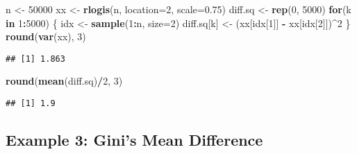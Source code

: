 \documentclass[]{book}
\newenvironment{Shaded}{\begin{snugshade}}{\end{snugshade}}
\newcommand{\ControlFlowTok}[1]{\textcolor[rgb]{0.13,0.29,0.53}{\textbf{#1}}}
\newcommand{\DataTypeTok}[1]{\textcolor[rgb]{0.13,0.29,0.53}{#1}}
\newcommand{\DecValTok}[1]{\textcolor[rgb]{0.00,0.00,0.81}{#1}}
\newcommand{\FloatTok}[1]{\textcolor[rgb]{0.00,0.00,0.81}{#1}}
\newcommand{\KeywordTok}[1]{\textcolor[rgb]{0.13,0.29,0.53}{\textbf{#1}}}
\newcommand{\NormalTok}[1]{#1}
\newcommand{\OperatorTok}[1]{\textcolor[rgb]{0.81,0.36,0.00}{\textbf{#1}}}
\newcommand{\StringTok}[1]{\textcolor[rgb]{0.31,0.60,0.02}{#1}}
\begin{document}
\begin{Shaded}
\begin{Highlighting}[]
\NormalTok{n <-}\StringTok{ }\DecValTok{50000}
\NormalTok{xx <-}\StringTok{ }\KeywordTok{rlogis}\NormalTok{(n, }\DataTypeTok{location=}\DecValTok{2}\NormalTok{, }\DataTypeTok{scale=}\FloatTok{0.75}\NormalTok{)}
\NormalTok{diff.sq <-}\StringTok{ }\KeywordTok{rep}\NormalTok{(}\DecValTok{0}\NormalTok{, }\DecValTok{5000}\NormalTok{)}
\ControlFlowTok{for}\NormalTok{(k }\ControlFlowTok{in} \DecValTok{1}\OperatorTok{:}\DecValTok{5000}\NormalTok{) \{}
\NormalTok{   idx <-}\StringTok{ }\KeywordTok{sample}\NormalTok{(}\DecValTok{1}\OperatorTok{:}\NormalTok{n, }\DataTypeTok{size=}\DecValTok{2}\NormalTok{)}
\NormalTok{   diff.sq[k] <-}\StringTok{ }\NormalTok{(xx[idx[}\DecValTok{1}\NormalTok{]] }\OperatorTok{-}\StringTok{ }\NormalTok{xx[idx[}\DecValTok{2}\NormalTok{]])}\OperatorTok{^}\DecValTok{2}
\NormalTok{\}}
\KeywordTok{round}\NormalTok{(}\KeywordTok{var}\NormalTok{(xx), }\DecValTok{3}\NormalTok{)}
\end{Highlighting}
\end{Shaded}

\begin{verbatim}
## [1] 1.863
\end{verbatim}

\begin{Shaded}
\begin{Highlighting}[]
\KeywordTok{round}\NormalTok{(}\KeywordTok{mean}\NormalTok{(diff.sq)}\OperatorTok{/}\DecValTok{2}\NormalTok{, }\DecValTok{3}\NormalTok{)}
\end{Highlighting}
\end{Shaded}

\begin{verbatim}
## [1] 1.9
\end{verbatim}

\hypertarget{example-3-ginis-mean-difference}{%
\subsection{Example 3: Gini's Mean Difference}\label{example-3-ginis-mean-difference}}
\end{document}
